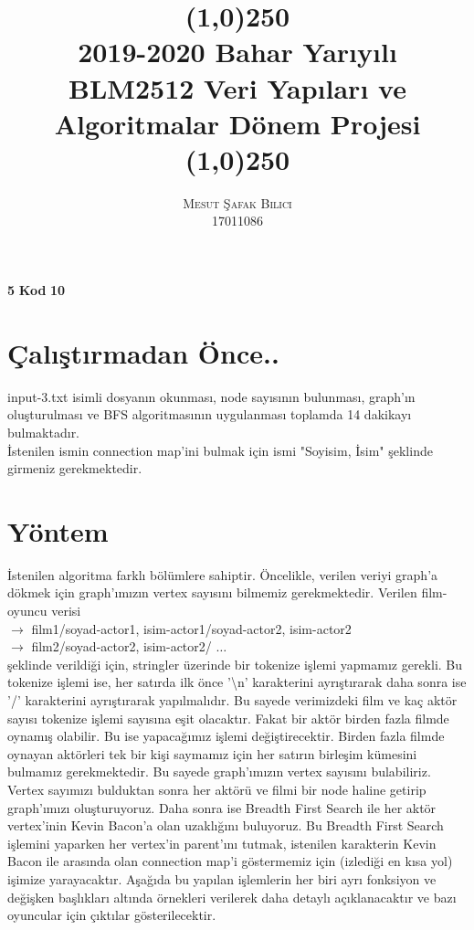 \documentclass[11pt]{article}
\date{}
\begin{document}
\title{\line(1,0){250} \\ \huge{\textbf{2019-2020 Bahar Yarıyılı \\ BLM2512 Veri Yapıları ve Algoritmalar Dönem Projesi}} \\\line(1,0){250}}
\author{\textsc{Mesut Şafak Bilici} \\ 17011086}
\maketitle
\tableofcontents
\hspace*{-0.6cm}\textbf{5} \; \textbf{Kod} \hspace*{12.3cm}\textbf{10}

\pagebreak
\section{Çalıştırmadan Önce..}
\hspace*{1cm} input-3.txt isimli dosyanın okunması, node sayısının bulunması, graph'ın oluşturulması ve BFS algoritmasının uygulanması toplamda 14 dakikayı bulmaktadır.\\
İstenilen ismin connection map'ini bulmak için ismi "Soyisim, İsim"
şeklinde girmeniz gerekmektedir.
\section{Yöntem}
\hspace*{1cm} İstenilen algoritma farklı bölümlere sahiptir. Öncelikle, verilen veriyi graph'a dökmek için graph'ımızın vertex sayısını bilmemiz gerekmektedir. Verilen film-oyuncu verisi\\
\hspace*{2cm} $\rightarrow$ film1/soyad-actor1, isim-actor1/soyad-actor2, isim-actor2\\
\hspace*{2cm} $\rightarrow$ film2/soyad-actor2, isim-actor2/ $\dots$\\
şeklinde verildiği için, stringler üzerinde bir tokenize işlemi yapmamız gerekli. Bu tokenize işlemi ise, her satırda ilk önce '\textbackslash n' karakterini ayrıştırarak daha sonra ise '/' karakterini ayrıştırarak yapılmalıdır. Bu sayede verimizdeki film ve kaç aktör sayısı tokenize işlemi sayısına eşit olacaktır. Fakat bir aktör birden fazla filmde oynamış olabilir. Bu ise yapacağımız işlemi değiştirecektir. Birden fazla filmde oynayan aktörleri tek bir kişi saymamız için her satırın birleşim kümesini bulmamız gerekmektedir. Bu sayede graph'ımızın vertex sayısını bulabiliriz. Vertex sayımızı bulduktan sonra her aktörü ve filmi bir node haline getirip graph'ımızı oluşturuyoruz. Daha sonra ise Breadth First Search ile her aktör vertex'inin Kevin Bacon'a olan uzaklığını buluyoruz. Bu Breadth First Search işlemini yaparken her vertex'in parent'ını tutmak, istenilen karakterin Kevin Bacon ile arasında olan connection map'i göstermemiz için (izlediği en kısa yol) işimize yarayacaktır. Aşağıda bu yapılan işlemlerin her biri ayrı fonksiyon ve değişken başlıkları altında örnekleri verilerek daha detaylı açıklanacaktır ve bazı oyuncular için çıktılar gösterilecektir.
\end{document}
